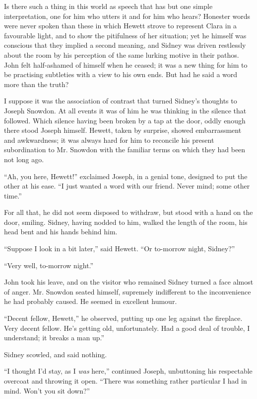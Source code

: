Is there such a thing in this world as speech that has but one simple
interpretation, one for him who utters it and for him who hears?
Honester words were never spoken than these in which Hewett strove to
represent Clara in a favourable light, and to show the pitifulness of
her situation; yet he himself was conscious that they implied a second
meaning, and Sidney was driven restlessly about the room by his
perception of the same lurking motive in their pathos. John felt
half-ashamed of himself when he ceased; it was a new thing for him to be
practising subtleties with a view to his own ends. But had he said a
word more than the truth?

I suppose it was the association of contrast that turned Sidney's
thoughts to Joseph Snowdon. At all events it was of him he was
{\protect\hypertarget{110}{}{}}thinking in the silence that followed.
Which silence having been broken by a tap at the door, oddly enough
there stood Joseph himself. Hewett, taken by surprise, showed
embarrassment and awkwardness; it was always hard for him to reconcile
his present subordination to Mr. Snowdon with the familiar terms on
which they had been not long ago.

``Ah, you here, Hewett!'' exclaimed Joseph, in a genial tone, designed
to put the other at his ease. ``I just wanted a word with our friend.
Never mind; some other time.''

For all that, he did not seem disposed to withdraw, but stood with a
hand on the door, smiling. Sidney, having nodded to him, walked the
length of the room, his head bent and his hands behind him.

``Suppose I look in a bit later,'' said Hewett. ``Or to-morrow night,
Sidney?''

``Very well, to-morrow night.''

John took his leave, and on the visitor who remained Sidney turned a
face almost of anger. Mr. Snowdon seated himself, supremely indifferent
to the inconvenience he had probably caused. He seemed in excellent
humour.

``Decent fellow, Hewett,'' he observed,
{\protect\hypertarget{111}{}{}}putting up one leg against the fireplace.
Very decent fellow. He's getting old, unfortunately. Had a good deal of
trouble, I understand; it breaks a man up.''

Sidney scowled, and said nothing.

``I thought I'd stay, as I \emph{was} here,'' continued Joseph,
unbuttoning his respectable overcoat and throwing it open. ``There was
something rather particular I had in mind. Won't you sit down?''

